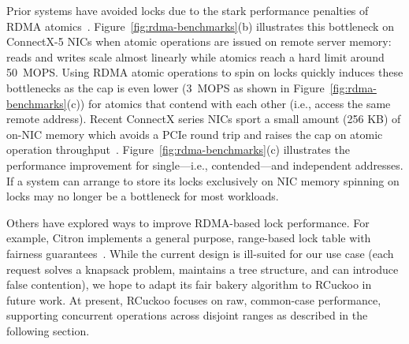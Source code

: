 
Prior systems have avoided locks due to the stark performance
penalties of RDMA atomics~\cite{design-guidelines}.
Figure~\ref{fig:rdma-benchmarks}(b) illustrates this bottleneck on
ConnectX-5 NICs when atomic operations are issued on remote server
memory: reads and writes scale almost linearly while atomics reach a
hard limit around 50~MOPS.  Using RDMA atomic operations to spin on
locks quickly induces these bottlenecks as the cap is even lower
(3~MOPS as shown in Figure~\ref{fig:rdma-benchmarks}(c)) for atomics
that contend with each other (i.e., access the same remote address).
Recent ConnectX series NICs sport a small amount (256 KB) of on-NIC
memory which avoids a PCIe round trip and raises the cap on atomic
operation
throughput~\cite{device-memory,sherman}. Figure~\ref{fig:rdma-benchmarks}(c)
illustrates the performance improvement for
single---i.e., contended---and independent addresses. If a system can arrange to store its locks exclusively on NIC memory spinning on locks may no
longer be a bottleneck for most workloads.

Others have explored ways to improve RDMA-based lock performance.  For
example, Citron implements a general purpose, range-based lock table
with fairness guarantees~\cite{citron}.  While the current design is
ill-suited for our use case (each request solves a knapsack problem,
maintains a tree structure, and can introduce false contention), we hope
to adapt its fair bakery algorithm to RCuckoo in future work.  At
present, RCuckoo focuses on raw, common-case performance, supporting
concurrent operations across disjoint ranges as described in the
following section.





